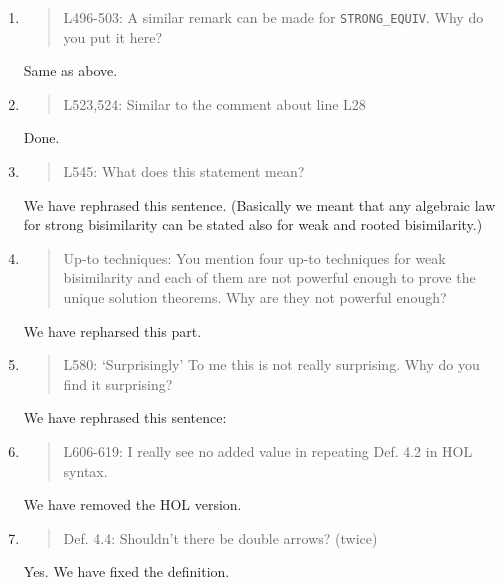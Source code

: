 \begin{enumerate}
\item \begin{quote}
    L496-503: A similar remark can be made for \texttt{STRONG\_EQUIV}. Why do you put it here?
  \end{quote}
   \Mark
 Same as above.

\item \begin{quote}
    L523,524: Similar to the comment about line L28
  \end{quote}
  \Mark
  Done.
  
\item \begin{quote}
    L545: What does this statement mean?
  \end{quote}
  \Mark
  We have rephrased this sentence. (Basically we meant that
any  algebraic law for strong bisimilarity can be stated also for
  weak and rooted bisimilarity.)

\item \begin{quote}
    Up-to techniques: You mention four up-to techniques for weak
    bisimilarity and each of them are not powerful enough to prove the
    unique solution theorems. Why are they not powerful enough?
  \end{quote}

  \Mark
  We have repharsed this part.
  
\item \begin{quote}
    L580: ‘Surprisingly’ To me this is not really surprising. Why do you find it surprising?
  \end{quote}
  \Mark
 We have rephrased this sentence:

\item \begin{quote}
    L606-619: I really see no added value in repeating Def. 4.2 in HOL syntax.
  \end{quote}
  \Mark
  We have removed the HOL version.
  
\item \begin{quote}
    Def. 4.4: Shouldn’t there be double arrows? (twice)
  \end{quote}
  \Mark
  Yes. We have fixed the definition.
  

\end{enumerate}
